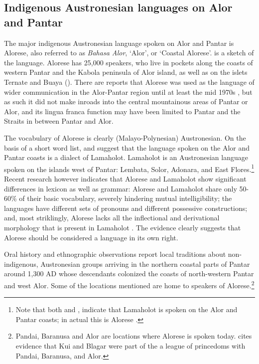 \subsection{Indigenous Austronesian languages on Alor and Pantar}
The major indigenous Austronesian language spoken on Alor and Pantar is Alorese, also referred to as \textit{Bahasa Alor}, `Alor', or `Coastal Alorese'. \citet{Klamer2011} is a sketch of the language. Alorese has 25,000 speakers, who live in pockets along the coasts of western Pantar and the Kabola peninsula of Alor island, as well as on the islets Ternate and Buaya (\citet[8-9]{Stokhof1975,GrimesEtAl1997,Lewis2009}). There are reports that Alorese was used as the language of wider communication in the Alor-Pantar region until at least the mid 1970s \citep[see][8]{Stokhof1975}, but as such it did not make inroads into the central mountainous areas of Pantar or Alor, and its lingua franca function may have been limited to Pantar and the Straits in between Pantar and Alor.

The vocabulary of Alorese is clearly (Malayo-Polynesian) Austronesian. On the basis of a short word list, \citet[9]{Stokhof1975} and \citet[645]{Steinhauer1993} suggest that the language spoken on the Alor and Pantar coasts is a dialect of Lamaholot. Lamaholot is an Austronesian language spoken on the islands west of Pantar: Lembata, Solor, Adonara, and East Flores.\footnote{Note that both \citet[275]{Barnes2001} and \citet[82]{Blust2009}, \citet[87]{Blust2013} indicate that Lamaholot is spoken on the Alor and Pantar coasts; in actual this is Alorese \citep[cf.][]{Klamer2011}.} Recent research however indicates that Alorese and Lamaholot show significant differences in lexicon as well as grammar: Alorese and Lamaholot share only 50-60\% of their basic vocabulary, severely hindering mutual intelligibility; the languages have different sets of pronouns and different possessive constructions; and, most striklingly, Alorese lacks all the inflectional and derivational morphology that is present in Lamaholot \citep{Klamer2011,Klamer2012}. The evidence clearly suggests that Alorese should be considered a language in its own right.

Oral history and ethnographic observations \citep{Anonymous1914,Lemoine1969,Rodemeijer2006} report local traditions about non-indigenous, Austronesian groups arriving in {the northern coastal parts of Pantar around 1,300 AD whose} descendants colonized the coasts of north-western Pantar and west Alor. Some of the locations mentioned are home to speakers of Alorese.\footnote{Pandai, Baranusa and Alor are locations where Alorese is spoken today. \citet[38]{Hagerdal2012} cites evidence that Kui and Blagar were part of the a league of princedoms with Pandai, Baranusa, and Alor.}

